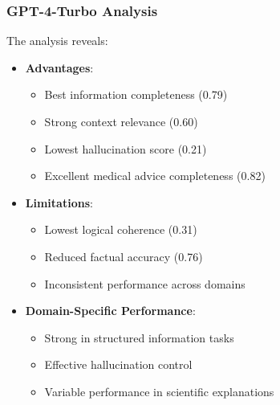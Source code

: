 \subsubsection{GPT-4-Turbo Analysis}
The analysis reveals:
\begin{itemize}
    \item \textbf{Advantages}:
    \begin{itemize}
        \item Best information completeness (0.79)
        \item Strong context relevance (0.60)
        \item Lowest hallucination score (0.21)
        \item Excellent medical advice completeness (0.82)
    \end{itemize}
    \item \textbf{Limitations}:
    \begin{itemize}
        \item Lowest logical coherence (0.31)
        \item Reduced factual accuracy (0.76)
        \item Inconsistent performance across domains
    \end{itemize}
    \item \textbf{Domain-Specific Performance}:
    \begin{itemize}
        \item Strong in structured information tasks
        \item Effective hallucination control
        \item Variable performance in scientific explanations
    \end{itemize}
\end{itemize}

